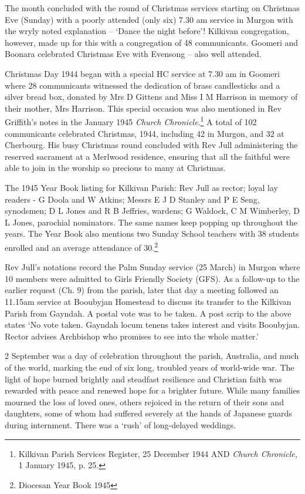 The month concluded with the round of Christmas services starting on Christmas Eve (Sunday) with a poorly attended (only six) 7.30 am service in Murgon with the wryly noted explanation -- `Dance the night before'! Kilkivan congregation, however, made up for this with a congregation of 48 communicants. Goomeri and Boonara celebrated Christmas Eve with Evensong -- also well attended.

Christmas Day 1944 began with a special HC service at 7.30 am in Goomeri where 28 communicants witnessed the dedication of brass candlesticks and a silver bread box, donated by Mrs D Gittens and Miss I M Harrison in memory of their mother, Mrs Harrison. This special occasion was also mentioned in Rev Griffith's notes in the January 1945 \emph{Church Chronicle}.\footnote{Kilkivan Parish Services Register, 25 December 1944 AND \emph{Church Chronicle,} 1 January 1945, p. 25.} A total of 102 communicants celebrated Christmas, 1944, including 42 in Murgon, and 32 at Cherbourg. His busy Christmas round concluded with Rev Jull administering the reserved sacrament at a Merlwood residence, ensuring that all the faithful were able to join in the worship so precious to many at Christmas.

The 1945 Year Book listing for Kilkivan Parish: Rev Jull as rector; loyal lay readers - G Doola and W Atkins; Messrs E J D Stanley and P E Seng, synodsmen; D L Jones and R B Jeffries, wardens; G Waldock, C M Wimberley, D L Jones, parochial nominators. The same names keep popping up throughout the years. The Year Book also mentions two Sunday School teachers with 38 students enrolled and an average attendance of 30.\footnote{Diocesan Year Book 1945}

Rev Jull's notations record the Palm Sunday service (25 March) in Murgon where 10 members were admitted to Girls Friendly Society (GFS). As a follow-up to the earlier request (Ch. 9) from the parish, later that day a meeting followed an 11.15am service at Booubyjan Homestead to discuss its transfer to the Kilkivan Parish from Gayndah. A postal vote was to be taken. A post scrip to the above states `No vote taken. Gayndah locum tenens takes interest and visits Booubyjan. Rector advises Archbishop who promises to see into the whole matter.'

2 September was a day of celebration throughout the parish, Australia, and much of the world, marking the end of six long, troubled years of world-wide war. The light of hope burned brightly and steadfast resilience and Christian faith was rewarded with peace and renewed hope for a brighter future. While many families mourned the loss of loved ones, others rejoiced in the return of their sons and daughters, some of whom had suffered severely at the hands of Japanese guards during internment. There was a `rush' of long-delayed weddings.

